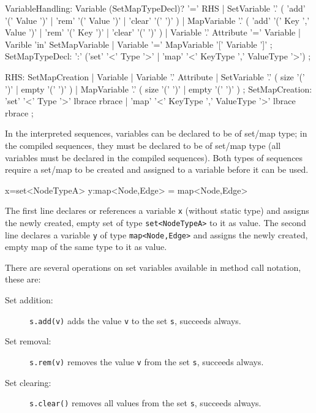 \begin{rail}
  VariableHandling: 
    Variable (SetMapTypeDecl)? '=' RHS |
    SetVariable '.' ( 'add' '(' Value ')' | 'rem' '(' Value ')' | 'clear' '(' ')' ) |
    MapVariable '.' ( 'add' '(' Key ',' Value ')' | 'rem' '(' Key ')' | 'clear' '(' ')' ) |
	Variable '.' Attribute '=' Variable |
	Varible 'in' SetMapVariable |
	Variable '=' MapVariable '[' Variable ']'
    ;
  SetMapTypeDecl: 
    ':' ('set' '<' Type '>' | 'map' '<' KeyType ',' ValueType '>')
    ;
\end{rail}\makeatother

\begin{rail}
  RHS:
    SetMapCreation |
	Variable |
	Variable '.' Attribute |
    SetVariable '.' ( size '(' ')' | empty '(' ')' ) |
    MapVariable '.' ( size '(' ')' | empty '(' ')' )
    ;
  SetMapCreation:
	'set' '<' Type '>' lbrace rbrace |
    'map' '<' KeyType ',' ValueType '>' lbrace rbrace
	;
\end{rail}\makeatother

In the interpreted sequences, variables can be declared to be of set/map type;
in the compiled sequences, they must be declared to be of set/map type (all variables must be declared in the compiled sequences).
Both types of sequences require a set/map to be created and assigned to a variable before it can be used.

\begin{example}
\begin{grgen}
x=set<NodeTypeA>{}
y:map<Node,Edge> = map<Node,Edge>{}
\end{grgen}
The first line declares or references a variable \texttt{x} (without static type) and assigns the newly created, empty set of type \texttt{set<NodeTypeA>} to it as value.
The second line declares a variable \texttt{y} of type \texttt{map<Node,Edge>} and assigns the newly created, empty map of the same type to it as value.
\end{example}

\noindent There are several operations on set variables available in method call notation, these are:

\begin{description}
\item[Set addition:] \texttt{s.add(v)} adds the value \texttt{v} to the set \texttt{s}, succeeds always.
\item[Set removal:] \texttt{s.rem(v)} removes the value \texttt{v} from the set \texttt{s}, succeeds always.
\item[Set clearing:] \texttt{s.clear()} removes all values from the set \texttt{s}, succeeds always.
\end{description}

